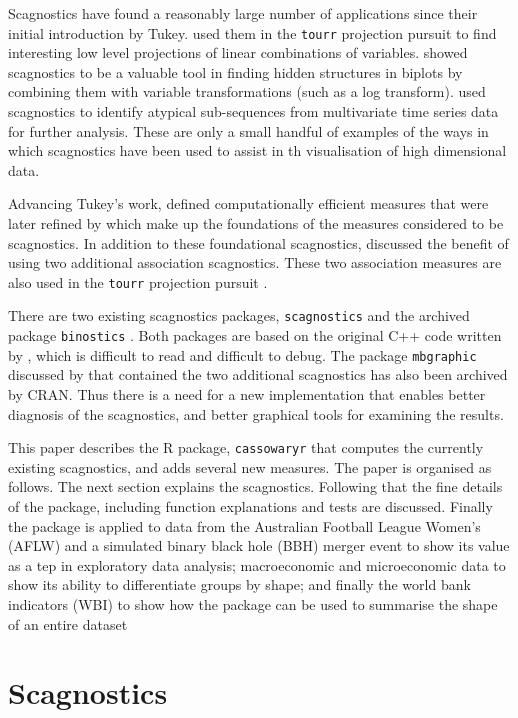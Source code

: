 Scagnostics have found a reasonably large number of applications since
their initial introduction by Tukey. \citet{tourrpp} used them in the
\texttt{tourr} projection pursuit to find interesting low level
projections of linear combinations of variables. \citet{hidscags} showed
scagnostics to be a valuable tool in finding hidden structures in
biplots by combining them with variable transformations (such as a log
transform). \citet{timeseer} used scagnostics to identify atypical
sub-sequences from multivariate time series data for further analysis.
These are only a small handful of examples of the ways in which
scagnostics have been used to assist in th visualisation of high
dimensional data.

Advancing Tukey's work, \citet{scag} defined computationally efficient
measures that were later refined by \citet{scagdist} which make up the
foundations of the measures considered to be scagnostics. In addition to
these foundational scagnostics, \citet{Grimm} discussed the benefit of
using two additional association scagnostics. These two association
measures are also used in the \texttt{tourr} projection pursuit
\citep{tourrpp}.

There are two existing scagnostics packages, \texttt{scagnostics}
\citep{scagdist} and the archived package \texttt{binostics}
\citep{binostics}. Both packages are based on the original C++ code
written by \citet{scagdist}, which is difficult to read and difficult to
debug. The package \texttt{mbgraphic} discussed by \citet{Grimm} that
contained the two additional scagnostics has also been archived by CRAN.
Thus there is a need for a new implementation that enables better
diagnosis of the scagnostics, and better graphical tools for examining
the results.

This paper describes the R package, \texttt{cassowaryr} that computes
the currently existing scagnostics, and adds several new measures. The
paper is organised as follows. The next section explains the
scagnostics. Following that the fine details of the package, including
function explanations and tests are discussed. Finally the package is
applied to data from the Australian Football League Women's (AFLW) and a
simulated binary black hole (BBH) merger event to show its value as a
tep in exploratory data analysis; macroeconomic and microeconomic data
to show its ability to differentiate groups by shape; and finally the
world bank indicators (WBI) to show how the package can be used to
summarise the shape of an entire dataset

\hypertarget{scagnostics}{%
\section{Scagnostics}\label{scagnostics}}

